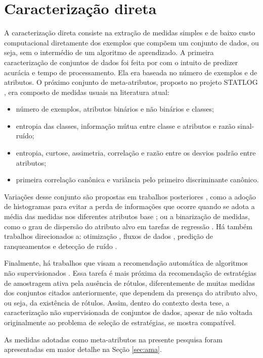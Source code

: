\section{Caracterização direta}\label{direta}
A caracterização direta consiste na extração de medidas simples e de baixo custo computacional diretamente dos exemplos que compõem um conjunto de dados, ou seja, sem o intermédio de um algoritmo de aprendizado.
A primeira caracterização de conjuntos de dados foi feita por 
 com o intuito de predizer acurácia e tempo de processamento.
Ela era baseada no número de exemplos e de atributos.
O próximo conjunto de meta-atributos, proposto no projeto STATLOG
\cite{brazdil1994analysis}, era composto de medidas usuais na literatura atual:
\begin{itemize}
 \item número de exemplos, atributos binários e não binários e classes;
 \item entropia das classes, informação mútua entre classe e atributos e razão sinal-ruído;
 \item entropia, curtose, assimetria, correlação e razão entre os desvios padrão entre atributos;
 \item primeira correlação canônica e variância pelo primeiro discriminante canônico.
\end{itemize}
Variações desse conjunto são propostas em trabalhos posteriores
\cite{books/daglib/0022052}, como a adoção de histogramas para evitar a perda de informações que ocorre quando se adota a média das medidas nos diferentes atributos base \cite{kalousis2002algorithm};
ou a binarização de medidas, como o grau de dispersão do atributo alvo em
tarefas de regressão \cite{journals/ijon/GomesPSRC12}.
Há também trabalhos direcionados a: otimização \cite{journals/ijhis/KandaCHS11}, fluxos de dados \cite{journals/ijon/RossiCSS14}, predição de ranqueamentos
\cite{conf/iberamia/SouzaCS10} e detecção de ruído \cite{Garcia2015}.

Finalmente, há trabalhos que visam a recomendação automática de algoritmos
não supervisionados \cite{conf/ijcnn/SoutoPSACLS08,Ferrari2015181}.
Essa tarefa é mais próxima da recomendação de estratégias de amostragem ativa pela ausência de rótulos, diferentemente de muitas medidas dos conjuntos citados anteriormente, que dependem da presença do atributo alvo, ou seja,
da existência de rótulos.
Assim, dentro do contexto desta tese, a caracterização não supervisionada
de conjuntos de dados, apesar de não voltada originalmente ao problema
de seleção de estratégias, se mostra compatível.

As medidas adotadas como meta-atributos na presente pesquisa foram apresentadas em maior detalhe na Seção \ref{sec:ama}.

